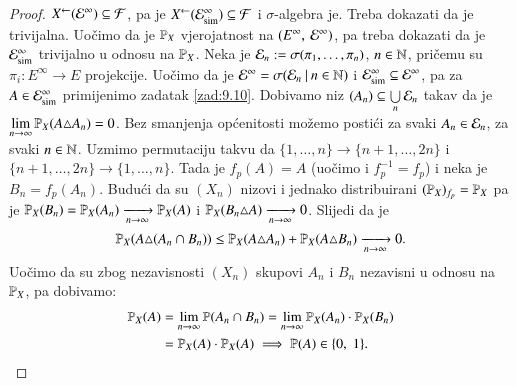 \begin{proof}
    ${X}^{\leftarrow} (\mathcal{E}^\infty) \subseteq \mathcal{F}$, pa je ${X}^{\leftarrow} (\mathcal{E}_{\mathrm{sim}}^\infty) \subseteq \mathcal{F}$ i $\sigma$-algebra je.
    Treba dokazati da je trivijalna.
    Uo\v cimo da je $\mathbb{P}_X$ vjerojatnost na $({E^\infty}, \: {\mathcal{E}^\infty})$, pa treba dokazati da je $\mathcal{E}_{\mathrm{sim}}^\infty$ trivijalno u odnosu na $\mathbb{P}_X$.
    Neka je $\mathcal{E}_n := \sigma({\pi_1, \ldots, \pi_n})$, $n \in \mathbb{N}$, pri\v cemu su $\pi_i : E^\infty \to E$ projekcije.
    Uo\v cimo da je $\mathcal{E}^\infty = \sigma({\mathcal{E}_n} \: | \: {n \in \mathbb{N}})$ i $\mathcal{E}_{\mathrm{sim}}^\infty \subseteq \mathcal{E}^\infty$, pa za $A \in \mathcal{E}_{\mathrm{sim}}^\infty$ primijenimo zadatak \ref{zad:9.10}.
    Dobivamo niz $(A_n) \subseteq \bigcup\limits_{n}^{} \mathcal{E}_n$ takav da je
    $\lim\limits_{n \to \infty} \mathbb{P}_X (A \triangle A_n) = 0$.
    Bez smanjenja op\' cenitosti mo\v zemo posti\' ci za svaki $A_n \in \mathcal{E}_n$, za svaki $n \in \mathbb{N}$.
    Uzmimo permutaciju takvu da $\{1, \ldots, n\} \to \{n+1, \ldots, 2n\}$ i $\{n+1, \ldots, 2n\} \to \{1, \ldots, n\}$.
    Tada je $f_p(A) = A$ (uo\v cimo i $f_p^{-1} = f_p$) i neka je $B_n = f_p (A_n)$.
    Budu\' ci da su $(X_n)$ nizovi i jednako distribuirani $(\mathbb{P}_X)_{f_p} = \mathbb{P}_X$ pa je $\mathbb{P}_X (B_n) = \mathbb{P}_X (A_n) \xrightarrow[n \to \infty]{} \mathbb{P}_X (A)$ i $\mathbb{P}_X (B_n \triangle A) \xrightarrow[n \to \infty]{} 0$.
    Slijedi da je
    \begin{equation*}
        \mathbb{P}_X (A \triangle (A_n \cap B_n)) \leq \mathbb{P}_X (A \triangle A_n) + \mathbb{P}_X (A \triangle B_n) \xrightarrow[n \to \infty]{} 0.
    \end{equation*}
    Uo\v cimo da su zbog nezavisnosti $(X_n)$ skupovi $A_n$ i $B_n$ nezavisni u odnosu na $\mathbb{P}_X$, pa dobivamo:
    \begin{equation*}
        \begin{aligned}
            \mathbb{P}_X (A)
            &= \lim\limits_{n \to \infty} \mathbb{P} (A_n \cap B_n) = \lim\limits_{n \to \infty} \mathbb{P}_X (A_n) \cdot \mathbb{P}_X (B_n)\\
            &= \mathbb{P}_X (A) \cdot \mathbb{P}_X(A) \implies \mathbb{P}(A) \in \{0, \; 1\}.
        \end{aligned}
    \end{equation*}
\end{proof}

